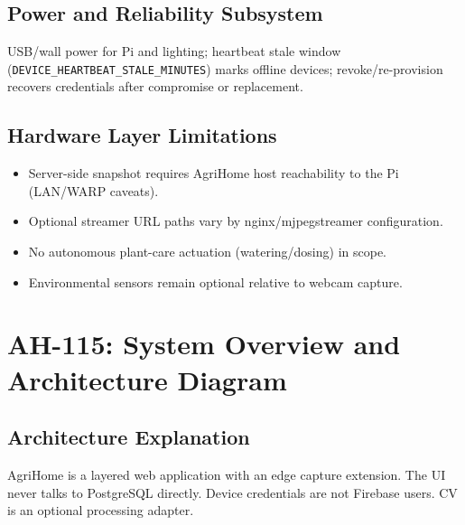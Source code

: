 \documentclass[11pt,letterpaper]{article}
\begin{document}
\subsection{Power and Reliability Subsystem}
USB/wall power for Pi and lighting; heartbeat stale window
(\texttt{DEVICE\_HEARTBEAT\_STALE\_MINUTES}) marks offline devices; revoke/re-provision recovers
credentials after compromise or replacement.

\subsection{Hardware Layer Limitations}
\begin{itemize}
  \item Server-side snapshot requires AgriHome host reachability to the Pi (LAN/WARP caveats).
  \item Optional streamer URL paths vary by nginx/mjpegstreamer configuration.
  \item No autonomous plant-care actuation (watering/dosing) in scope.
  \item Environmental sensors remain optional relative to webcam capture.
\end{itemize}

\section{AH-115: System Overview and Architecture Diagram}

\subsection{Architecture Explanation}
AgriHome is a layered web application with an edge capture extension. The UI never talks to
PostgreSQL directly. Device credentials are not Firebase users. CV is an optional processing
adapter.
\end{document}

